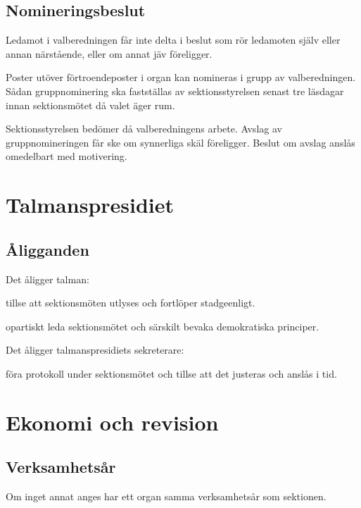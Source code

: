 \documentclass{styrdokument}
\begin{document}
\subsection{Nomineringsbeslut}
\? Ledamot i valberedningen får inte delta i beslut som rör ledamoten själv eller annan närstående, eller om annat jäv föreligger.

\? Poster utöver förtroendeposter i organ kan nomineras i grupp av valberedningen.
Sådan gruppnominering ska fastställas av sektionsstyrelsen senast tre läsdagar innan sektionsmötet då valet äger rum.
\label{valb:grupp}

\? Sektionsstyrelsen bedömer då valberedningens arbete. 
Avslag av gruppnomineringen får ske om synnerliga skäl föreligger.
Beslut om avslag anslås omedelbart med motivering.


\section{Talmanspresidiet}
\subsection{Åligganden}
\? Det åligger talman:
\begin{aligganden}
    \item tillse att sektionsmöten utlyses och fortlöper stadgeenligt.
    \item opartiskt leda sektionsmötet och särskilt bevaka demokratiska principer.
\end{aligganden}

\? Det åligger talmanspresidiets sekreterare:
\begin{aligganden}
    \item föra protokoll under sektionsmötet och tillse att det justeras och anslås i tid.
\end{aligganden}


\section{Ekonomi och revision}
\subsection{Verksamhetsår}
\? Om inget annat anges har ett organ samma verksamhetsår som sektionen.
\end{document}
